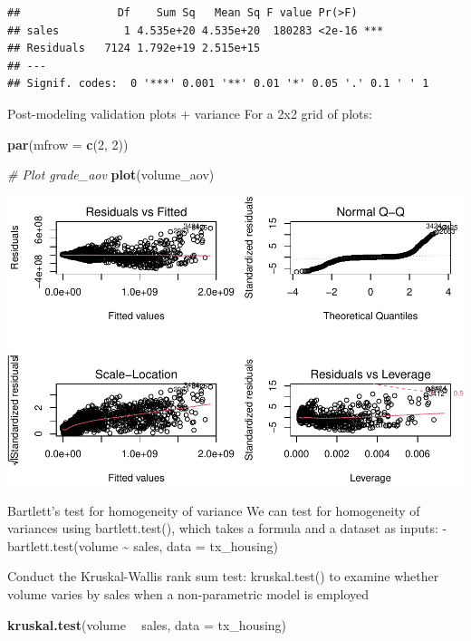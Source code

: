\documentclass[]{book}
\newenvironment{Shaded}{\begin{snugshade}}{\end{snugshade}}
\newcommand{\CommentTok}[1]{\textcolor[rgb]{0.56,0.35,0.01}{\textit{#1}}}
\newcommand{\DataTypeTok}[1]{\textcolor[rgb]{0.13,0.29,0.53}{#1}}
\newcommand{\DecValTok}[1]{\textcolor[rgb]{0.00,0.00,0.81}{#1}}
\newcommand{\KeywordTok}[1]{\textcolor[rgb]{0.13,0.29,0.53}{\textbf{#1}}}
\newcommand{\NormalTok}[1]{#1}
\newcommand{\OperatorTok}[1]{\textcolor[rgb]{0.81,0.36,0.00}{\textbf{#1}}}
\newcommand{\StringTok}[1]{\textcolor[rgb]{0.31,0.60,0.02}{#1}}
\begin{document}
\begin{verbatim}
##               Df    Sum Sq   Mean Sq F value Pr(>F)    
## sales          1 4.535e+20 4.535e+20  180283 <2e-16 ***
## Residuals   7124 1.792e+19 2.515e+15                   
## ---
## Signif. codes:  0 '***' 0.001 '**' 0.01 '*' 0.05 '.' 0.1 ' ' 1
\end{verbatim}

Post-modeling validation plots + variance
For a 2x2 grid of plots:

\begin{Shaded}
\begin{Highlighting}[]
\KeywordTok{par}\NormalTok{(}\DataTypeTok{mfrow =} \KeywordTok{c}\NormalTok{(}\DecValTok{2}\NormalTok{, }\DecValTok{2}\NormalTok{))}

\CommentTok{# Plot grade_aov}
\KeywordTok{plot}\NormalTok{(volume_aov)}
\end{Highlighting}
\end{Shaded}

\includegraphics{code4stem_files/figure-latex/qq plots-1.pdf}

Bartlett's test for homogeneity of variance
We can test for homogeneity of variances using bartlett.test(), which takes a formula and a dataset as inputs:
- bartlett.test(volume \textasciitilde{} sales, data = tx\_housing)

Conduct the Kruskal-Wallis rank sum test:
kruskal.test() to examine whether volume varies by sales when a non-parametric model is employed

\begin{Shaded}
\begin{Highlighting}[]
\KeywordTok{kruskal.test}\NormalTok{(volume }\OperatorTok{~}\StringTok{ }\NormalTok{sales,}
             \DataTypeTok{data =}\NormalTok{ tx_housing)}
\end{Highlighting}
\end{Shaded}
\end{document}
